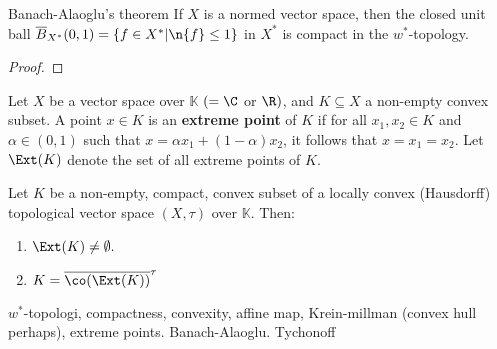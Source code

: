 

\begin{theorem}{Banach-Alaoglu's theorem}
If $X$ is a normed vector space, then the closed unit ball $\overline{B}_{X^{*}}(0,1)=\{f\in X^{*} | \n{f}\le 1\}$ in $X^{*}$ is compact in the $w^{*}$-topology.
\end{theorem}
\begin{proof}

\end{proof}




\begin{definition}
Let $X$ be a vector space over $\mathbb{K}$ $(=\C$ or $\R)$, and $K\subseteq X$ a non-empty convex subset. A point $x \in K$ is an \textbf{extreme point} of $K$ if for all $x_{1},x_{2}\in K$ and $\alpha \in (0,1)$ such that $x=\alpha x_{1} + (1-\alpha) x_{2}$, it follows that $x=x_{1}=x_{2}$. Let $\Ext(K)$ denote the set of all extreme points of $K$.
\end{definition}



\begin{theorem}
Let $K$ be a non-empty, compact, convex subset of a locally convex (Hausdorff) topological vector space $(X, \tau)$ over $\mathbb{K}$. Then:
\begin{enumerate}
\item $\Ext(K) \neq \emptyset.$
\item $K = \overline{ \co( \Ext( K ) ) }^{\tau}$
\end{enumerate}
\end{theorem}




$w^{*}$-topologi, compactness, convexity, affine map, Krein-millman (convex hull perhaps), extreme points. Banach-Alaoglu. Tychonoff


